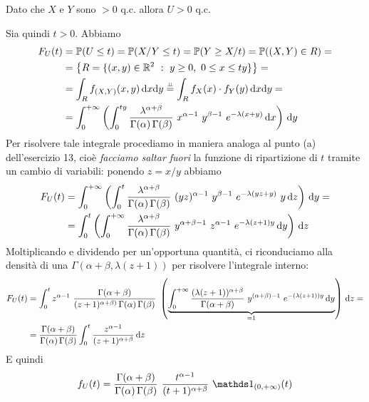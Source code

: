 \Soluzione{}
Dato che $X$ e $Y$ sono $>0$ q.c. allora $U>0$ q.c. 

Sia quindi $t>0$. Abbiamo
\begin{gather*}
\begin{aligned}
F_U(t)&=\PP(U\leq t)=\PP(X/Y\leq t)=\PP(Y\geq X/t)=\PP((X,Y)\in R)=\\
&=\left\{ R=\{(x,y)\in\RR^2\ :\ y\geq 0,\ 0\leq x\leq ty \} \right\}=\\
&=\int_R \fXYxy\dxy\overset{\underset{\indep}{}}{=}\int_R f_X(x)\cdot f_Y(y)\dxy=\\
&=\int_0^{+\infty}\left(\int_0^{ty}\frac{\lambda^{\alpha+\beta}}{\Gamma(\alpha)\,\Gamma(\beta)}\ x^{\alpha-1}\ y^{\beta-1}\ e^{-\lambda(x+y)}\dx\right)\dy
\end{aligned}
\end{gather*}
Per risolvere tale integrale procediamo in maniera analoga al punto (a) dell'esercizio 13, cioè \emph{facciamo saltar fuori} la funzione di ripartizione di $t$ tramite un cambio di variabili: ponendo $z=x/y$ abbiamo
\begin{gather*}
\begin{aligned}
F_U(t)&=\int_0^{+\infty}\left(\int_0^{t}\frac{\lambda^{\alpha+\beta}}{\Gamma(\alpha)\,\Gamma(\beta)}\ (yz)^{\alpha-1}\ y^{\beta-1}\ e^{-\lambda(yz+y)}\ y\dz\right)\dy= \\
&=\int_0^t\left (\int_0^{+\infty}\frac{\lambda^{\alpha+\beta}}{\Gamma(\alpha)\,\Gamma(\beta)}\ y^{\alpha+\beta-1}\ z^{\alpha-1}\ e^{-\lambda(z+1)y}\dy\right)\dz
\end{aligned}
\end{gather*}
Moltiplicando e dividendo per un'opportuna quantità, ci riconduciamo alla densità di una $\Gamma(\alpha+\beta,\lambda(z+1))$ per risolvere l'integrale interno:
\begin{gather*}
\begin{aligned}
F_U(t)&=\int_0^t z^{\alpha-1}\ \frac{\Gamma(\alpha+\beta)}{(z+1)^{\alpha+\beta)}\,\Gamma(\alpha)\,\Gamma(\beta)}\ \left (\underbrace{\int_0^{+\infty}\frac{(\lambda(z+1))^{\alpha+\beta}}{\Gamma(\alpha+\beta)}\ y^{(\alpha+\beta)-1}\ e^{-(\lambda(z+1))y}\dy}_{=1}\right)\dz=\\
&=\frac{\Gamma(\alpha+\beta)}{\Gamma(\alpha)\,\Gamma(\beta)}\int_0^t\frac{z^{\alpha-1}}{(z+1)^{\alpha+\beta}}\dz
\end{aligned}
\end{gather*}
E quindi
\[
f_U(t)=\frac{\Gamma(\alpha+\beta)}{\Gamma(\alpha)\,\Gamma(\beta)}\ \frac{t^{\alpha-1}}{(t+1)^{\alpha+\beta}}\ \Ind_{(0,+\infty)}(t)
\]

